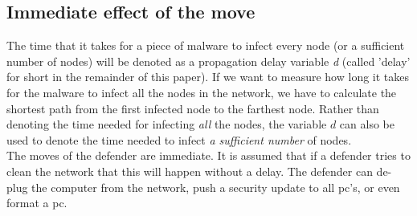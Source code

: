 \subsection{Immediate effect of the move}
The time that it takes for a piece of malware to infect every node (or a sufficient number of nodes) will be
denoted as a propagation delay variable \textit{d} (called 'delay' for short in the remainder of this paper). If we want to measure how long it takes for the malware to infect all the nodes in the network, we have to calculate the shortest path from the
first infected node to the farthest node. Rather than denoting the time needed for infecting \textit{all} the nodes, the variable $d$ can also be used to denote the time needed to infect \textit{a sufficient number} of nodes. \\
The moves of the defender are immediate. It is assumed that if a defender tries to clean the network that this will happen without a delay. The defender can de-plug the computer from the network, push a security update to all pc's, or even format a pc. 
